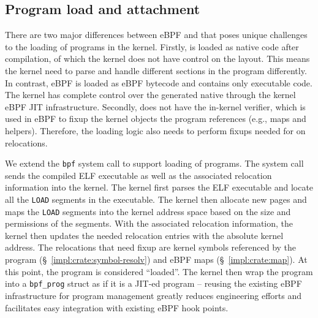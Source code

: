 \subsection{Program load and attachment}
There are two major differences between eBPF and \projname{} that poses unique
    challenges to the loading of \projname{} programs in the kernel.
Firstly, \projname{} is loaded as native code after compilation, of which the
    kernel does not have control on the layout.
This means the kernel need to parse and handle different sections in the
    program differently.
In contrast, eBPF is loaded as eBPF bytecode and contains only executable code.
The kernel has complete control over the generated native through the kernel
    eBPF JIT infrastructure.
Secondly, \projname{} does not have the in-kernel verifier, which is used in
    eBPF to fixup the kernel objects the program references (e.g., maps and
    helpers).
Therefore, the loading logic also needs to perform fixups needed for
    \projname{} on relocations.

We extend the \texttt{bpf} system call to support loading of \projname{}
    programs.
The system call sends the compiled ELF executable as well as the associated
    relocation information into the kernel.
The kernel first parses the ELF executable and locate all the \texttt{LOAD}
    segments in the executable.
The kernel then allocate new pages and maps the \texttt{LOAD} segments into the
    kernel address space based on the size and permissions of the segments.
With the associated relocation information, the kernel then updates the needed
    relocation entries with the absolute kernel address.
The relocations that need fixup are kernel symbols referenced by the
    \projname{} program (\S~\ref{impl:crate:symbol-resolv}) and eBPF maps
    (\S~\ref{impl:crate:map}).
At this point, the program is considered ``loaded''.
The kernel then wrap the program into a \texttt{bpf\_prog} struct as if it is a
    JIT-ed program -- reusing the existing eBPF infrastructure for program
    management greatly reduces engineering efforts and facilitates easy
    integration with existing eBPF hook points.

